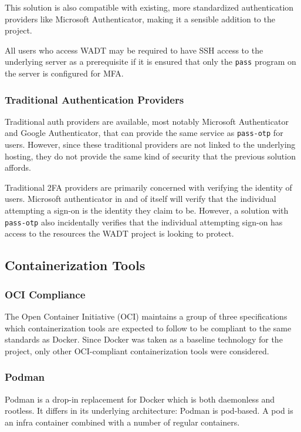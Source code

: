 \documentclass[12pt]{article}
\begin{document}
This solution is also compatible with existing, more standardized authentication providers like Microsoft Authenticator, making it a sensible addition to the project.

All users who access WADT may be required to have SSH access to the underlying server as a prerequisite if it is ensured that only the \texttt{pass} program on the server is configured for MFA.


\subsubsection{Traditional Authentication Providers}
Traditional auth providers are available, most notably Microsoft Authenticator and Google Authenticator, that can provide the same service as \texttt{pass-otp} for users. However, since these traditional providers are not linked to the underlying hosting, they do not provide the same kind of security that the previous solution affords.

Traditional 2FA providers are primarily concerned with verifying the identity of users. Microsoft authenticator in and of itself will verify that the individual attempting a sign-on is the identity they claim to be. However, a solution with \texttt{pass-otp} also incidentally verifies that the individual attempting sign-on has access to the resources the WADT project is looking to protect.


\subsection{Containerization Tools}
\subsubsection{OCI Compliance}
The Open Container Initiative (OCI) maintains a group of three specifications which containerization tools are expected to follow to be compliant to the same standards as Docker. Since Docker was taken as a baseline technology for the project, only other OCI-compliant containerization tools were considered.

\subsubsection{Podman}
Podman is a drop-in replacement for Docker which is both daemonless and rootless. It differs in its underlying architecture: Podman is pod-based. A pod is an infra container combined with a number of regular containers.
\end{document}
